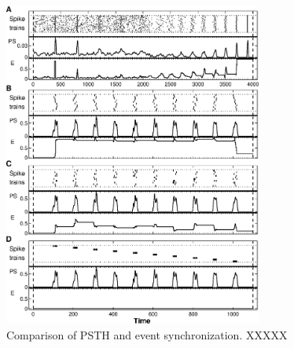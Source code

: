 \documentclass[10pt,twocolumn]{elsart5p}
\begin{document}
%
%
\begin{figure}
    \includegraphics[width=85mm]{PSTH_ES.eps}
    \caption{\abb\label{fig:PSTH-ES} Comparison of PSTH and event synchronization. \citep{QuianQuiroga02b} XXXXX}
\end{figure}
%
%



	
%
%
\end{document}
